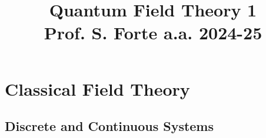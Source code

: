 \documentclass[a4paper, 12pt, openany]{book}
\title{\Huge\textbf{Quantum Field Theory 1} \\ \large Prof. S. Forte a.a. 2024-25}
\begin{document}
\frontmatter

\maketitle
\tableofcontents

\mainmatter

\part{Classical Field Theory}
\pagestyle{body}

\chapter{Discrete and Continuous Systems}

\end{document}
